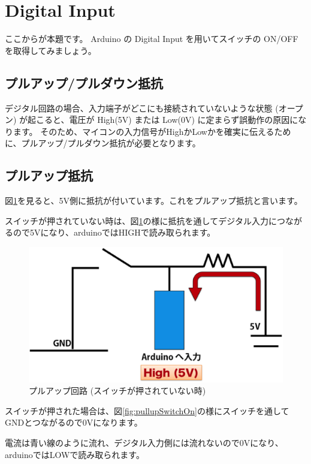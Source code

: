 \documentclass[11pt,a4paper]{jarticle}
\begin{document}
\section{Digital Input}
ここからが本題です。
Arduino の Digital Input を用いてスイッチの ON/OFF を取得してみましょう。


\subsection*{プルアップ/プルダウン抵抗}
デジタル回路の場合、入力端子がどこにも接続されていないような状態 (オープン) が起こると、電圧が High(5V) または Low(0V) に定まらず誤動作の原因になります。
そのため、マイコンの入力信号がHighかLowかを確実に伝えるために、プルアップ/プルダウン抵抗が必要となります。


\subsection{プルアップ抵抗}
 図\ref{fig:pullupSwitchOff}を見ると、5V側に抵抗が付いています。これをプルアップ抵抗と言います。
 
 スイッチが押されていない時は、図\ref{fig:pullupSwitchOff}の様に抵抗を通してデジタル入力につながるので5Vになり、arduinoではHIGHで読み取られます。
 
 \begin{figure}[htbp]
  \centering
  \includegraphics[width=0.6\columnwidth]{img/pullup_off.eps}
  \caption{プルアップ回路 (スイッチが押されていない時) }
  \label{fig:pullupSwitchOff}
\end{figure}

スイッチが押された場合は、図\ref{fig:pullupSwitchOn}の様にスイッチを通してGNDとつながるので0Vになります。
  
電流は青い線のように流れ、デジタル入力側には流れないので0Vになり、arduinoではLOWで読み取られます。
\end{document}
